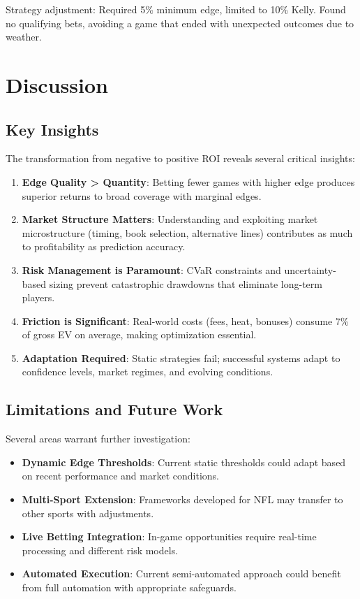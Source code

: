 Strategy adjustment: Required 5\% minimum edge, limited to 10\% Kelly. Found no qualifying bets, avoiding a game that ended with unexpected outcomes due to weather.

\section{Discussion}

\subsection{Key Insights}

The transformation from negative to positive ROI reveals several critical insights:

\begin{enumerate}
  \item \textbf{Edge Quality > Quantity}: Betting fewer games with higher edge produces superior returns to broad coverage with marginal edges.

  \item \textbf{Market Structure Matters}: Understanding and exploiting market microstructure (timing, book selection, alternative lines) contributes as much to profitability as prediction accuracy.

  \item \textbf{Risk Management is Paramount}: CVaR constraints and uncertainty-based sizing prevent catastrophic drawdowns that eliminate long-term players.

  \item \textbf{Friction is Significant}: Real-world costs (fees, heat, bonuses) consume 7\% of gross EV on average, making optimization essential.

  \item \textbf{Adaptation Required}: Static strategies fail; successful systems adapt to confidence levels, market regimes, and evolving conditions.
\end{enumerate}

\subsection{Limitations and Future Work}

Several areas warrant further investigation:

\begin{itemize}
  \item \textbf{Dynamic Edge Thresholds}: Current static thresholds could adapt based on recent performance and market conditions.

  \item \textbf{Multi-Sport Extension}: Frameworks developed for NFL may transfer to other sports with adjustments.

  \item \textbf{Live Betting Integration}: In-game opportunities require real-time processing and different risk models.

  \item \textbf{Automated Execution}: Current semi-automated approach could benefit from full automation with appropriate safeguards.
\end{itemize}

